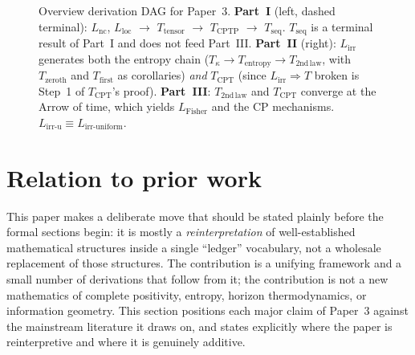 \documentclass[11pt]{article}
\begin{document}
\begin{figure}[h]
\caption{Overview derivation DAG for Paper~3.
\textbf{Part~I} (left, dashed terminal): $L_{\mathrm{nc}}$, $L_{\mathrm{loc}}$
$\to$ $T_{\mathrm{tensor}}$ $\to$ $T_{\mathrm{CPTP}}$ $\to$ $T_{\mathrm{seq}}$.
$T_{\mathrm{seq}}$ is a terminal result of Part~I and does not feed Part~III.
\textbf{Part~II} (right): $L_{\mathrm{irr}}$ generates both the entropy chain
($T_\kappa \to T_{\mathrm{entropy}} \to T_{\mathrm{2nd\,law}}$, with
$T_{\mathrm{zeroth}}$ and $T_{\mathrm{first}}$ as corollaries) \emph{and}
$T_{\mathrm{CPT}}$ (since $L_{\mathrm{irr}} \Rightarrow T$ broken is Step~1 of
$T_{\mathrm{CPT}}$'s proof).
\textbf{Part~III}: $T_{\mathrm{2nd\,law}}$ and $T_{\mathrm{CPT}}$ converge at
the Arrow of time, which yields $L_{\mathrm{Fisher}}$ and the CP mechanisms.
$L_{\mathrm{irr\text{-}u}} \equiv L_{\mathrm{irr\text{-}uniform}}$.}
\label{fig:overview_dag}
\end{figure}


\section{Relation to prior work}
\label{sec:related_work}

This paper makes a deliberate move that should be stated plainly before the
formal sections begin: it is mostly a \emph{reinterpretation} of well-established
mathematical structures inside a single ``ledger'' vocabulary, not a wholesale
replacement of those structures.  The contribution is a unifying framework
and a small number of derivations that follow from it; the contribution is
not a new mathematics of complete positivity, entropy, horizon thermodynamics,
or information geometry.  This section positions each major claim of Paper~3
against the mainstream literature it draws on, and states explicitly where
the paper is reinterpretive and where it is genuinely additive.
\end{document}
